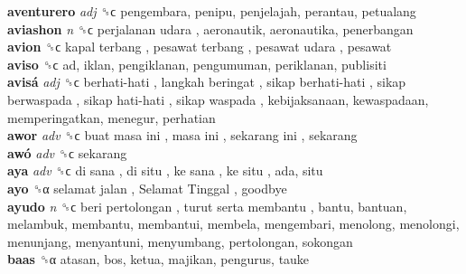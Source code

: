 \textbf{aventurero} \emph{adj}  ␝ϲ  pengembara, penipu, penjelajah, perantau, petualang  \\
\textbf{aviashon} \emph{n}  ␝ϲ   perjalanan udara , aeronautik, aeronautika, penerbangan  \\
\textbf{avion} ␝ϲ   kapal terbang ,  pesawat terbang ,  pesawat udara , pesawat  \\
\textbf{aviso} ␝ϲ  ad, iklan, pengiklanan, pengumuman, periklanan, publisiti  \\
\textbf{avisá} \emph{adj}  ␝ϲ   berhati-hati ,  langkah beringat ,  sikap berhati-hati ,  sikap berwaspada ,  sikap hati-hati ,  sikap waspada , kebijaksanaan, kewaspadaan, memperingatkan, menegur, perhatian  \\
\textbf{awor} \emph{adv}  ␝ϲ   buat masa ini ,  masa ini ,  sekarang ini , sekarang  \\
\textbf{awó} \emph{adv}  ␝ϲ  sekarang  \\
\textbf{aya} \emph{adv}  ␝ϲ   di sana ,  di situ ,  ke sana ,  ke situ , ada, situ  \\
\textbf{ayo} ␝α   selamat jalan ,  Selamat Tinggal , goodbye  \\
\textbf{ayudo} \emph{n}  ␝ϲ   beri pertolongan ,  turut serta membantu , bantu, bantuan, melambuk, membantu, membantui, membela, mengembari, menolong, menolongi, menunjang, menyantuni, menyumbang, pertolongan, sokongan  \\
\textbf{baas} ␝α  atasan, bos, ketua, majikan, pengurus, tauke  \\
